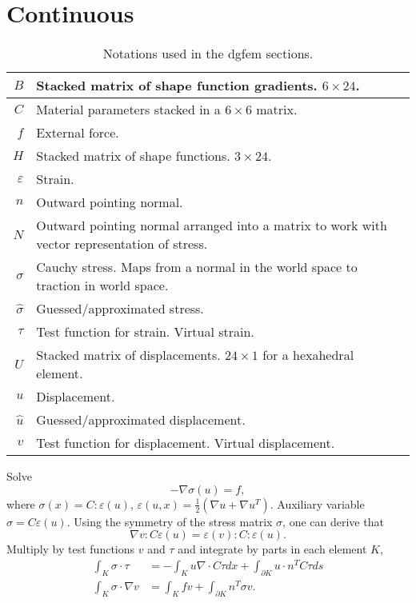 \documentclass{article}
\begin{document}
\section{Continuous}
	\begin{table}
		\centering
		\begin{tabular}{| r | p{8cm} |}
			\hline
			$B$ & Stacked matrix of shape function gradients. $6\times 24$.\\
			\hline
			$C$ & Material parameters stacked in a $6\times 6$ matrix.\\
			\hline
			$f$ & External force.\\
			\hline
			$H$ & Stacked matrix of shape functions. $3\times 24$.\\
			\hline
			$\varepsilon$ & Strain.\\
			\hline
			$n$ & Outward pointing normal.\\
			\hline
			$N$ & Outward pointing normal arranged into a matrix to work with vector representation of stress.\\
			\hline
			$\sigma$ & Cauchy stress. Maps from a normal in the world space to traction in world space.\\
			\hline
			$\hat{\sigma}$ & Guessed/approximated stress.\\
			\hline
			$\tau$ & Test function for strain. Virtual strain.\\
			\hline
			$U$ & Stacked matrix of displacements. $24\times 1$ for a hexahedral element.\\
			\hline
			$u$ & Displacement. \\
			\hline
			$\hat{u}$ & Guessed/approximated displacement.\\
			\hline
			$v$ & Test function for displacement. Virtual displacement.\\
			\hline
		\end{tabular}
		\caption{Notations used in the dgfem sections.}
		\label{table:dgsymbols}
	\end{table}
	Solve
	\[
	-\nabla\sigma(u) = f,
	\]
	where $\sigma(x) = C:\varepsilon(u)$, 
		  $\varepsilon(u,x) = \frac{1}{2}(\nabla u + \nabla u^T)$.
	Auxiliary variable $\sigma = C\varepsilon(u)$.
	Using the symmetry of the stress matrix $\sigma$, one can derive that
	\[
	\nabla v : C \varepsilon(u) = \varepsilon(v) : C : \varepsilon(u).
	\]
	Multiply by test functions $v$ and $\tau$ and integrate by parts in each element $K$,
	\begin{align}
	\int_K \sigma \cdot \tau&=-\int_Ku\nabla\cdot C\tau dx +\int_{\partial K}u \cdot n^T C\tau ds\\
	\int_K \sigma \cdot \nabla v&=\int_K fv +\int_{\partial K}n^T\sigma v.
	\end{align}
\end{document}
